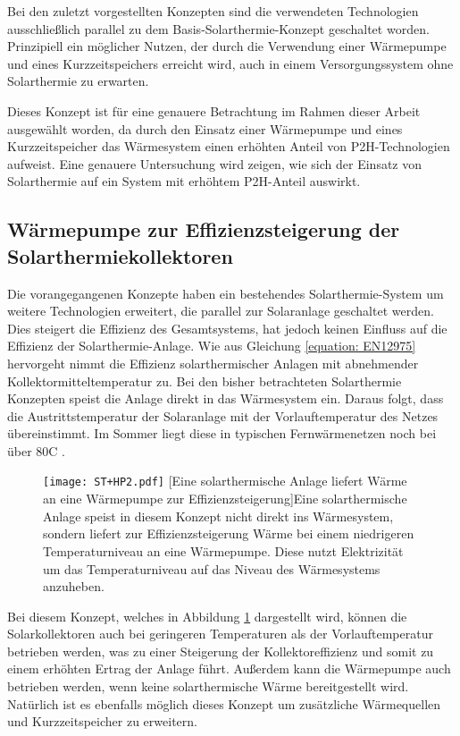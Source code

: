 Bei den zuletzt vorgestellten Konzepten sind die verwendeten Technologien ausschließlich parallel zu dem Basis-Solarthermie-Konzept geschaltet worden. Prinzipiell ein möglicher Nutzen, der durch die Verwendung einer Wärmepumpe und eines Kurzzeitspeichers erreicht wird, auch in einem Versorgungssystem ohne Solarthermie zu erwarten. 

Dieses Konzept ist für eine genauere Betrachtung im Rahmen dieser Arbeit ausgewählt worden, da durch den Einsatz einer Wärmepumpe und eines Kurzzeitspeicher das Wärmesystem einen erhöhten Anteil von \ac{P2H}-Technologien aufweist. Eine genauere Untersuchung wird zeigen, wie sich der Einsatz von Solarthermie auf ein System mit erhöhtem \ac{P2H}-Anteil auswirkt.  

\subsection*{Wärmepumpe zur Effizienzsteigerung der Solarthermiekollektoren}
Die vorangegangenen Konzepte haben ein bestehendes Solarthermie-System um weitere Technologien erweitert, die parallel zur Solaranlage geschaltet werden. Dies steigert die Effizienz des Gesamtsystems, hat jedoch keinen Einfluss auf die Effizienz der Solarthermie-Anlage. Wie aus Gleichung \ref{equation: EN12975} hervorgeht nimmt die Effizienz solarthermischer Anlagen mit abnehmender Kollektormitteltemperatur zu. Bei den bisher betrachteten Solarthermie Konzepten speist die Anlage direkt in das Wärmesystem ein. Daraus folgt, dass die Austrittstemperatur der Solaranlage mit der Vorlauftemperatur des Netzes übereinstimmt. Im Sommer liegt diese in typischen Fernwärmenetzen noch bei über 80\textdegree C \cite{stadtwerke_flensburg_gmbh_2019_2553968}. 
	\begin{figure}[ht]
		\centering
		\texttt{[image: ST+HP2.pdf]}
		[Eine solarthermische Anlage liefert Wärme an eine Wärmepumpe zur Effizienzsteigerung]{Eine solarthermische Anlage speist in diesem Konzept nicht direkt ins Wärmesystem, sondern liefert zur Effizienzsteigerung Wärme bei einem niedrigeren Temperaturniveau an eine Wärmepumpe. Diese nutzt Elektrizität um das Temperaturniveau auf das Niveau des Wärmesystems anzuheben.}
		\label{fig: ST+HP2}
	\end{figure}

Bei diesem Konzept, welches in Abbildung \ref{fig: ST+HP2} dargestellt wird, können die Solarkollektoren auch bei geringeren Temperaturen als der Vorlauftemperatur betrieben werden, was zu einer Steigerung der Kollektoreffizienz und somit zu einem erhöhten Ertrag der Anlage führt. Außerdem kann die Wärmepumpe auch betrieben werden, wenn keine solarthermische Wärme bereitgestellt wird. Natürlich ist es ebenfalls möglich dieses Konzept  um zusätzliche Wärmequellen und Kurzzeitspeicher zu erweitern.

